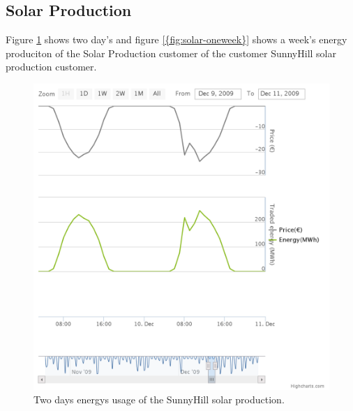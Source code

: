 \subsection{Solar Production}
Figure \ref{fig:solar-twoday} shows two day's and  figure \ref{{fig:solar-oneweek}} shows a week's energy produciton of the Solar Production customer of the customer SunnyHill solar production customer.

\begin{figure}[h!]
  \includegraphics[width=\linewidth]{sunnyhill-twoday.png}
  \caption{Two days energys usage of the SunnyHill solar production.}
  \label{fig:solar-twoday}
\end{figure}


